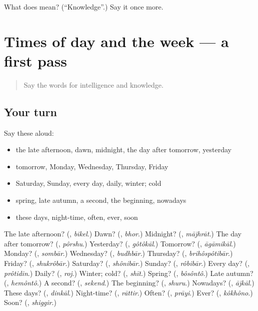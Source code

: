 \begin{tcolorbox}[breakable,colback=teal!4,colframe=teal!35!black,title={Before you move on}]
What does  mean? (\textquotedblleft{}Knowledge\textquotedblright{}.) Say it once more.
\end{tcolorbox}
\section[(dialogue)]{Times of day and the week — a first pass}

\label{lesson:BN-R99-first-pass-times-of-day-and-the-week}



\begin{quote}
Say the words for intelligence and knowledge.
\end{quote}

\subsection*{Your turn}
Say these aloud:

\begin{itemize}
\raggedright
  \item the late afternoon, dawn, midnight, the day after tomorrow, yesterday
  \item tomorrow, Monday, Wednesday, Thursday, Friday
  \item Saturday, Sunday, every day, daily, winter; cold
  \item spring, late autumn, a second, the beginning, nowadays
  \item these days, night-time, often, ever, soon
\end{itemize}

\begin{tcolorbox}[breakable,colback=teal!4,colframe=teal!35!black,title={Before you move on}]
The late afternoon? (\textbf{}, \emph{bikel}.) Dawn? (\textbf{}, \emph{bhor}.) Midnight? (\textbf{}, \emph{mājhrāt}.) The day after tomorrow? (\textbf{}, \emph{pôrshu}.) Yesterday? (\textbf{}, \emph{gôtôkāl}.) Tomorrow? (\textbf{}, \emph{āgāmikāl}.) Monday? (\textbf{}, \emph{sombār}.) Wednesday? (\textbf{}, \emph{budhbār}.) Thursday? (\textbf{}, \emph{brihôspôtibār}.) Friday? (\textbf{}, \emph{shukrôbār}.) Saturday? (\textbf{}, \emph{shônibār}.) Sunday? (\textbf{}, \emph{rôbibār}.) Every day? (\textbf{}, \emph{prôtidin}.) Daily? (\textbf{}, \emph{roj}.) Winter; cold? (\textbf{}, \emph{shīt}.) Spring? (\textbf{}, \emph{bôsôntô}.) Late autumn? (\textbf{}, \emph{hemôntô}.) A second? (\textbf{}, \emph{sekend}.) The beginning? (\textbf{}, \emph{shuru}.) Nowadays? (\textbf{}, \emph{ājkāl}.) These days? (\textbf{}, \emph{dinkāl}.) Night-time? (\textbf{}, \emph{rāttir}.) Often? (\textbf{}, \emph{prāyi}.) Ever? (\textbf{}, \emph{kôkhôno}.) Soon? (\textbf{}, \emph{shiggir}.)
\end{tcolorbox}
